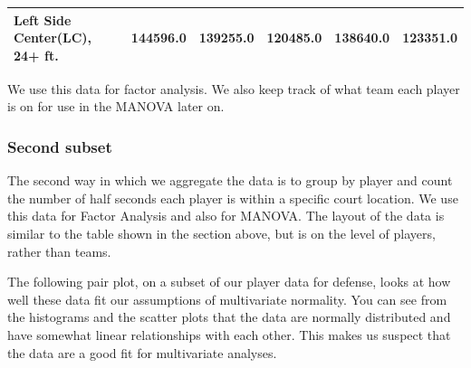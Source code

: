 \documentclass[]{article}
\begin{document}
\begin{longtable}[]{@{}llllll@{}}
\begin{minipage}[t]{0.24\columnwidth}\raggedright\strut
Left Side Center(LC), 24+ ft.\strut
\end{minipage} & \begin{minipage}[t]{0.12\columnwidth}\raggedright\strut
144596.0\strut
\end{minipage} & \begin{minipage}[t]{0.12\columnwidth}\raggedright\strut
139255.0\strut
\end{minipage} & \begin{minipage}[t]{0.10\columnwidth}\raggedright\strut
120485.0\strut
\end{minipage} & \begin{minipage}[t]{0.12\columnwidth}\raggedright\strut
138640.0\strut
\end{minipage} & \begin{minipage}[t]{0.12\columnwidth}\raggedright\strut
123351.0\strut
\end{minipage}\tabularnewline
\bottomrule
\end{longtable}

We use this data for factor analysis. We also keep track of what team
each player is on for use in the MANOVA later on.

\subsubsection{Second subset}\label{second-subset}

The second way in which we aggregate the data is to group by player and
count the number of half seconds each player is within a specific court
location. We use this data for Factor Analysis and also for MANOVA. The
layout of the data is similar to the table shown in the section above,
but is on the level of players, rather than teams.

The following pair plot, on a subset of our player data for defense,
looks at how well these data fit our assumptions of multivariate
normality. You can see from the histograms and the scatter plots that
the data are normally distributed and have somewhat linear relationships
with each other. This makes us suspect that the data are a good fit for
multivariate analyses.
\end{document}
